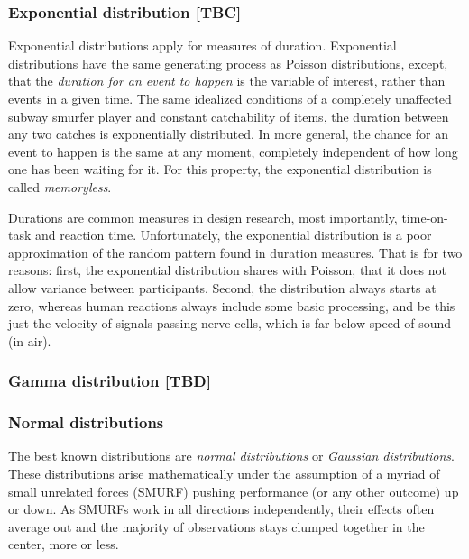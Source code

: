 \documentclass[]{svmono}
\begin{document}
\subsubsection{Exponential distribution
{[}TBC{]}}\label{exponential-distribution-tbc}

Exponential distributions apply for measures of duration. Exponential
distributions have the same generating process as Poisson distributions,
except, that the \emph{duration for an event to happen} is the variable
of interest, rather than events in a given time. The same idealized
conditions of a completely unaffected subway smurfer player and constant
catchability of items, the duration between any two catches is
exponentially distributed. In more general, the chance for an event to
happen is the same at any moment, completely independent of how long one
has been waiting for it. For this property, the exponential distribution
is called \emph{memoryless}.

Durations are common measures in design research, most importantly,
time-on-task and reaction time. Unfortunately, the exponential
distribution is a poor approximation of the random pattern found in
duration measures. That is for two reasons: first, the exponential
distribution shares with Poisson, that it does not allow variance
between participants. Second, the distribution always starts at zero,
whereas human reactions always include some basic processing, and be
this just the velocity of signals passing nerve cells, which is far
below speed of sound (in air).

\subsubsection{Gamma distribution
{[}TBD{]}}\label{gamma-distribution-tbd}

\subsubsection{Normal distributions}\label{normal-distributions}

The best known distributions are \emph{normal distributions} or
\emph{Gaussian distributions}. These distributions arise mathematically
under the assumption of a myriad of small unrelated forces (SMURF)
pushing performance (or any other outcome) up or down. As SMURFs work in
all directions independently, their effects often average out and the
majority of observations stays clumped together in the center, more or
less.
\end{document}
